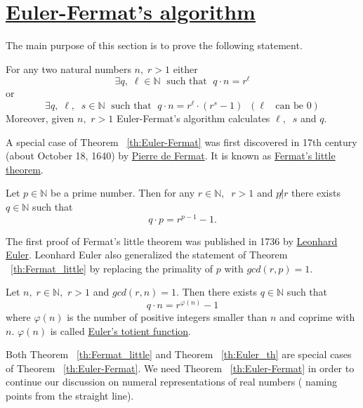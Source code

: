 \documentclass[color=black,11pt]{elegantpaper}
\begin{document}
\section{\href{https://www.researchgate.net/publication/326632583_Euler-Fermat_algorithm_and_some_of_its_applications}{Euler-Fermat's algorithm}} 
\label{sec:Euler-Fermat_algorithm}
The main purpose of this section is to prove the following statement.
\begin{theorem}
\label{th:Euler-Fermat}
For any two natural numbers $n,\;r > 1$  either
$$
\exists q, \; \ell \in \mathbb{N}\;\mbox{ such that }\;q\cdot n = r^{\ell}
$$  
or
$$
\exists q, \; \ell,\;\;s \in \mathbb{N}\;\mbox{ such that }\;q\cdot n=r^{\ell} \cdot (r^s  - 1 )\;\;(\ell\;\;\mbox{ can be }0 )
$$
Moreover, given $n,$ $r>1$ Euler-Fermat's algorithm calculates $\ell,\;\;s$ and $q.$
\end{theorem}
A special case of Theorem ~\ref{th:Euler-Fermat} was first discovered in 17th century (about October 18, 1640) by \href{https://en.wikipedia.org/wiki/Fermat%27s_little_theorem}{Pierre de Fermat}. It is known as \href{https://en.wikipedia.org/wiki/Fermat's_little_theorem}{Fermat's little theorem}. 
\begin{theorem}
\label{th:Fermat_little}
Let $p\in \mathbb{N}$ be a prime number. Then for any $r \in \mathbb{N},\;\;r > 1  $ and $p \not| r$ there exists $q \in \mathbb{N}$ such that
$$
q\cdot p = r^{p-1} - 1. 
$$
\end{theorem}
The first proof of Fermat's little theorem was published in 1736  by \href{https://en.wikipedia.org/wiki/Leonhard_Euler}{Leonhard Euler}. Leonhard Euler also generalized the statement of Theorem ~\ref{th:Fermat_little} by replacing the primality of $p$ with $ gcd(r,p)=1.$
\begin{theorem}
\label{th:Euler_th}
Let $n,\;r\in \mathbb{N},$ $r>1$ and $gcd(r,n)=1.$ Then there exists $q \in \mathbb{N}$ such that
$$
q \cdot n = r^{\varphi (n)} -1
$$
where $\varphi (n)$ is the number of positive integers smaller than $n$ and coprime with $n.$ $\varphi (n)$ is called \href{https://en.wikipedia.org/wiki/Euler's_totient_function}{Euler's totient function}.
\end{theorem}
Both Theorem ~\ref{th:Fermat_little} and  Theorem ~\ref{th:Euler_th} are special cases of Theorem ~\ref{th:Euler-Fermat}. We need Theorem ~\ref{th:Euler-Fermat} in order to continue our discussion  on numeral representations of real numbers ( naming points from the straight line).
\end{document}
